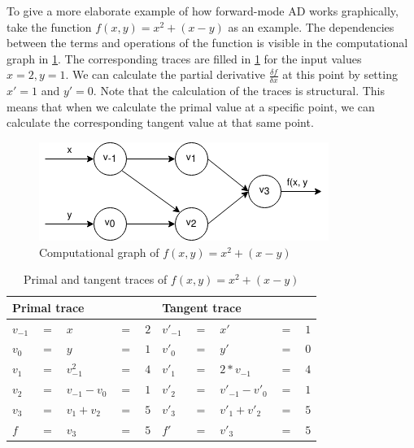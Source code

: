 To give a more elaborate example of how forward-mode AD works graphically, take the function $f(x, y) = x^2 + (x - y)$ as an example.
The dependencies between the terms and operations of the function is visible in the computational graph in \cref{fig:func_trace}.
The corresponding traces are filled in \cref{table:func_trace} for the input values $x = 2, y = 1$.
We can calculate the partial derivative $\frac{\delta f}{\delta x}$ at this point by setting $x' = 1$ and $y' = 0$.
Note that the calculation of the traces is structural.
This means that when we calculate the primal value at a specific point, we can calculate the corresponding tangent value at that same point.

\begin{figure}
  \centering
  \includegraphics[scale=0.6]{./assets/function_trace.png}
  \caption{Computational graph of $f(x, y) = x^2 + (x - y)$}
  \label{fig:func_trace}
\end{figure}

\begin{table}
  \begin{center}
    \begin{tabular}{ l l l l l | l l l l l }
      \hline
      \multicolumn{5}{l}{Primal trace} & \multicolumn{5}{l}{Tangent trace} \\
      \hline
$v_{-1} $&$=$&$x$&$=$&$2$             &$v'_{-1}$&$=$&$x'$&$=$&$1$ \\
$v_0    $&$=$&$y$&$=$&$1$             &$v'_{0}$&$=$&$y'$&$=$&$0$ \\
      \hline
$v_1    $&$=$&$v_{-1}^2$&$=$&$4$      &$v'_{1}$&$=$&$2*v_{-1}$&$=$&$4$ \\
$v_2    $&$=$&$v_{-1} - v_{0}$&$=$&$1$&$v'_{2}$&$=$&$v'_{-1}-v'_{0}$&$=$&$1$ \\
$v_3    $&$=$&$v_1 + v_2$&$=$&$5$     &$v'_{3}$&$=$&$v'_1 + v'_2$&$=$&$5$ \\
      \hline
$f      $&$=$&$v_3$&$=$&$5$           &$f'$&$=$&$v'_3$&$=$&$5$ \\
      \hline
    \end{tabular}
  \end{center}
  \caption{Primal and tangent traces of $f(x, y) = x^2 + (x - y)$}
  \label{table:func_trace}
\end{table}

